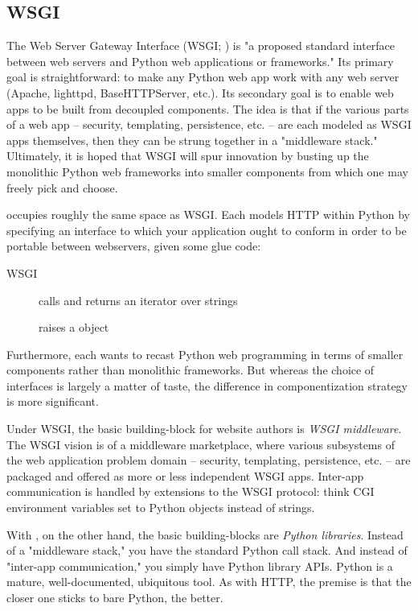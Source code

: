 \subsection{WSGI \label{wsgi}}

The Web Server Gateway Interface (WSGI; ) is "a proposed standard
interface between web servers and Python web applications or frameworks." Its
primary goal is straightforward: to make any Python web app work with any web
server (Apache, lighttpd, BaseHTTPServer, etc.). Its secondary goal is to enable
web apps to be built from decoupled components. The idea is that if the various
parts of a web app -- security, templating, persistence, etc. -- are each
modeled as WSGI apps themselves, then they can be strung together in a
"middleware stack." Ultimately, it is hoped that WSGI will spur innovation by
busting up the monolithic Python web frameworks into smaller components from
which one may freely pick and choose.

 occupies roughly the same space as WSGI. Each models HTTP within
Python by specifying an interface to which your application ought to conform in
order to be portable between webservers, given some glue code:

\begin{description}

\item[WSGI]
    { calls  and returns
    an iterator over strings}

\item[]
    { raises a  object}

\end{description}


Furthermore, each wants to recast Python web programming in terms of smaller
components rather than monolithic frameworks. But whereas the choice of
interfaces is largely a matter of taste, the difference in componentization
strategy is more significant.

Under WSGI, the basic building-block for website authors is \emph{WSGI
middleware}. The WSGI vision is of a middleware marketplace, where various
subsystems of the web application problem domain -- security, templating,
persistence, etc. -- are packaged and offered as more or less independent WSGI
apps. Inter-app communication is handled by extensions to the WSGI protocol:
think CGI environment variables set to Python objects instead of strings.

With , on the other hand, the basic building-blocks are
\emph{Python libraries}. Instead of a "middleware stack," you have the standard
Python call stack. And instead of "inter-app communication," you simply have
Python library APIs. Python is a mature, well-documented, ubiquitous tool. As
with HTTP, the premise is that the closer one sticks to bare Python, the better.
